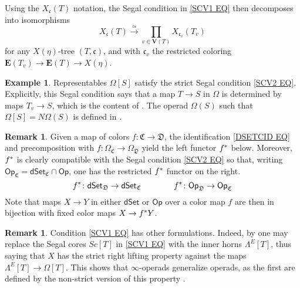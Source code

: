 \documentclass[a4paper,10pt
,draft
]{article}%
\numberwithin{equation}{section}
\numberwithin{figure}{section}
\theoremstyle{definition} %
\newtheorem{example}[equation]{Example}%
\newtheorem{remark}[equation]{Remark}%
\newcommand{\Op}{\mathsf{Op}}%
\newcommand{\dSet}{\mathsf{dSet}}
\newcommand{\1}{\ensuremath{\mathbbm 1}}%
\begin{document}
Using the $X_{\mathfrak c}(T)$ notation, 
the Segal condition in \eqref{SCV1 EQ}
then decomposes into isomorphisms
	\begin{equation}\label{SCV2 EQ}
	X_{\mathfrak c}(T) \xrightarrow{\simeq} \prod_{v \in \boldsymbol{V}(T)} X_{\mathfrak c_v}(T_v)
	\end{equation}
for any $X(\eta)$-tree $(T,\mathfrak{c})$,
and with $\mathfrak{c}_v$
the restricted coloring
$\boldsymbol{E}(T_v) \to \boldsymbol{E}(T) \to X(\eta)$.


\begin{example}\label{OMTSEG EX}
	Representables $\Omega[S]$ satisfy
	the strict Segal condition \eqref{SCV2 EQ}.
	Explicitly, this Segal condition says
	that a map
	$T\to S$ in $\Omega$ is determined by maps
	$T_v\to S$, 
	which is the content of \cite[Prop. 5.11]{Per18}.
	The operad $\Omega(S)$
	such that $\Omega[S] = N \Omega(S)$
	is defined in \cite[\S 3]{MW07}.
\end{example}


\begin{remark}\label{PULLBACKS REM}
Given a map of colors 
$f \colon \mathfrak{C} \to \mathfrak{D}$,
the identification \eqref{DSETCID EQ}
and precomposition with 
$f\colon \Omega_\mathfrak{C} \to \Omega_\mathfrak{D}$
yield the left functor $f^{\**}$ below.
Moreover, $f^{\**}$ is clearly compatible with the Segal condition
\eqref{SCV2 EQ} so that, writing
$\Op_{\mathfrak{C}} = \dSet_{\mathfrak{C}} \cap \Op$,
one has the restricted $f^{\**}$ functor on the right.
\[
f^{\**} \colon \dSet_{\mathfrak{D}} \to \dSet_{\mathfrak{C}}
\qquad \qquad
f^{\**} \colon \Op_{\mathfrak{D}} \to \Op_{\mathfrak{C}}
\]
Note that maps $X \to Y$ in either $\dSet$ or $\Op$
over a color map $f$ are then in bijection with fixed color maps
$X \to f^{\**} Y$.
\end{remark}


\begin{remark}\label{SSCOTHER REM}
	Condition \eqref{SCV1 EQ} has other formulations.
	Indeed, by \cite[Props. 3.22, 3.31]{BP_edss}
	one may replace the Segal cores $Sc[T]$
	in \eqref{SCV1 EQ} with the inner horns $\Lambda^E[T]$,
	thus saying that $X$ has the strict
	right lifting property against the maps
	$\Lambda^E[T] \to \Omega[T]$.
	This shows that $\infty$-operads generalize operads,
	as the first are defined by the 
	non-strict version of this property \cite[\S 5]{MW09}.
\end{remark}
\end{document}
